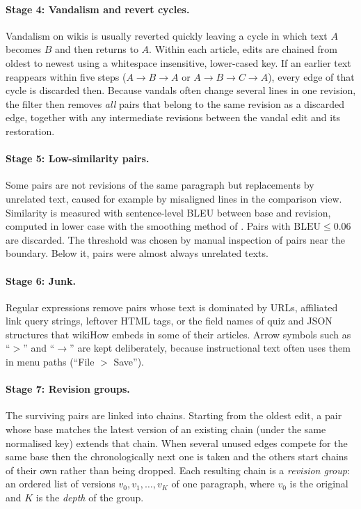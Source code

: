 \documentclass[12pt,a4paper,oneside]{report}
\begin{document}
\paragraph{Stage 4: Vandalism and revert cycles.} Vandalism on wikis is usually reverted quickly leaving a cycle in which text $A$ becomes $B$ and then returns to $A$. Within each article, edits are chained from oldest to newest using a whitespace insensitive, lower-cased key. If an earlier text reappears within five steps ($A\to B\to A$ or $A\to B\to C\to A$), every edge of that cycle is discarded then. Because vandals often change several lines in one revision, the filter then removes \emph{all} pairs that belong to the same revision as a discarded edge, together with any intermediate revisions between the vandal edit and its restoration.

\paragraph{Stage 5: Low-similarity pairs.} Some pairs are not revisions of the same paragraph but replacements by unrelated text, caused for example by misaligned lines in the comparison view. Similarity is measured with sentence-level BLEU \citep{papineni2002} between base and revision, computed in lower case with the smoothing method of \citet{chen2014}. Pairs with $\mathrm{BLEU} \le 0.06$ are discarded. The threshold was chosen by manual inspection of pairs near the boundary. Below it, pairs were almost always unrelated texts.

\paragraph{Stage 6: Junk.} Regular expressions remove pairs whose text is dominated by URLs, affiliated link query strings, leftover HTML tags, or the field names of quiz and JSON structures that wikiHow embeds in some of their articles. Arrow symbols such as ``$>$'' and ``$\rightarrow$'' are kept deliberately, because instructional text often uses them in menu paths (``File $>$ Save'').

\paragraph{Stage 7: Revision groups.} The surviving pairs are linked into chains. Starting from the oldest edit, a pair whose base matches the latest version of an existing chain (under the same normalised key) extends that chain. When several unused edges compete for the same base then the chronologically next one is taken and the others start chains of their own rather than being dropped. Each resulting chain is a \emph{revision group}: an ordered list of versions $v_0, v_1, \ldots, v_K$ of one paragraph, where $v_0$ is the original and $K$ is the \emph{depth} of the group.
\end{document}
